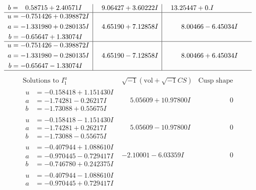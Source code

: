 \documentclass[1p]{elsarticle_modified}
\theoremstyle{definition}
\newcommand{\I}{\sqrt{-1}}
\begin{document}
$$\begin{array}{c|c|c}
\begin{aligned}
b &= \phantom{-}0.58715 + 2.40571 I\end{aligned}
 & \phantom{-}9.06427 + 3.60222 I & \phantom{-}13.25447 + 0. I\phantom{ +0.000000I} \\ \hline\begin{aligned}
u &= -0.751426 + 0.398872 I \\
a &= -1.331980 + 0.280135 I \\
b &= -0.65647 + 1.33074 I\end{aligned}
 & \phantom{-}4.65190 + 7.12858 I & \phantom{-}8.00466 - 6.45034 I \\ \hline\begin{aligned}
u &= -0.751426 - 0.398872 I \\
a &= -1.331980 - 0.280135 I \\
b &= -0.65647 - 1.33074 I\end{aligned}
 & \phantom{-}4.65190 - 7.12858 I & \phantom{-}8.00466 + 6.45034 I\\
 \hline 
 \end{array}$$\newpage$$\begin{array}{c|c|c}  
\text{Solutions to }I^u_{1}& \I (\text{vol} + \sqrt{-1}CS) & \text{Cusp shape}\\
 \hline 
\begin{aligned}
u &= -0.158418 + 1.151430 I \\
a &= -1.74281 - 0.26217 I \\
b &= -1.73088 + 0.55675 I\end{aligned}
 & \phantom{-}5.05609 + 10.97800 I & \phantom{-0.000000 } 0 \\ \hline\begin{aligned}
u &= -0.158418 - 1.151430 I \\
a &= -1.74281 + 0.26217 I \\
b &= -1.73088 - 0.55675 I\end{aligned}
 & \phantom{-}5.05609 - 10.97800 I & \phantom{-0.000000 } 0 \\ \hline\begin{aligned}
u &= -0.407944 + 1.088610 I \\
a &= -0.970445 - 0.729417 I \\
b &= -0.746780 + 0.242375 I\end{aligned}
 & -2.10001 - 6.03359 I & \phantom{-0.000000 } 0 \\ \hline\begin{aligned}
u &= -0.407944 - 1.088610 I \\
a &= -0.970445 + 0.729417 I \\

\end{aligned}
\end{array}$$
\end{document}
